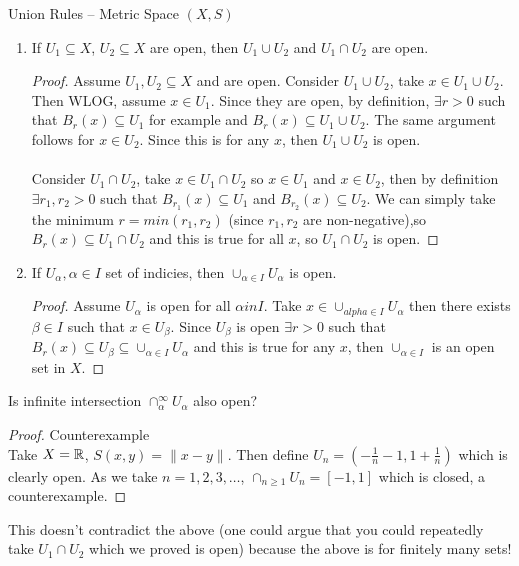 \documentclass[a4paper]{article}
\begin{document}
\begin{prop}
  Union Rules -- Metric Space $(X, S)$
  \begin{enumerate}
    \item If $U_1 \subseteq X$, $U_2 \subseteq X$ are open, then $U_1 \cup U_2$ and $U_1 \cap U_2$ are open.
      \begin{proof}
        Assume $U_1, U_2 \subseteq X$ and are open. Consider $U_1 \cup U_2$, take $x \in U_1 \cup U_2$. Then WLOG, assume $x \in
        U_1$. Since they are open, by definition, $\exists r > 0$ such that $B_r (x) \subseteq U_1$ for example and 
        $B_r (x) \subseteq U_1 \cup U_2$. The same argument follows for $x \in U_2$. Since this is for any $x$, then $U_1 \cup U_2$ is open. \\ \\
        Consider $U_1 \cap U_2$, take $x \in U_1 \cap U_2$ so $x \in U_1$ and $x \in U_2$, then by definition $\exists r_1,r_2 > 0$ such that $B_{r_1}(x) \subseteq U_1$
        and $B_{r_2}(x) \subseteq U_2$. We can simply take the minimum $r = min(r_1,r_2)$ (since $r_1,r_2$ are non-negative),so 
        $B_r(x) \subseteq U_1 \cap U_2$ and this is true for all $x$, so $U_1 \cap U_2$ is open. 
      \end{proof}
    \item If $U_{\alpha}, \alpha \in I$ set of indicies, then $\cup_{\alpha \in I} U_{\alpha}$ is open.
      \begin{proof}
        Assume $U_\alpha$ is open for all $\alpha in I$. Take $x \in \cup_{alpha \in I} U_\alpha$ then there exists $\beta \in I$ such that 
        $x \in U_{\beta}$. Since $U_\beta$ is open $\exists r > 0$ such that $B_r(x) \subseteq U_\beta \subseteq 
        \cup_{\alpha \in I} U_\alpha$ and this is true for any $x$, then $\cup_{\alpha \in I}$ is an open set in $X$.
      \end{proof}
  \end{enumerate}
\end{prop}

\begin{remark}
  Is infinite intersection $\cap_{\alpha}^\infty U_{\alpha}$ also open?
  \begin{proof}{Counterexample}\\
    Take $X = \mathbb{R}$, $S(x,y) = \| x -y\|$. Then define $U_n =\left( - \frac{1}{n} -1 , 1 + \frac{1}{n} \right)$ which
    is clearly open. As we take $n = 1,2,3,\ldots$, $\cap_{n \geq 1} U_n = [-1,1]$ which is closed, a counterexample.
  \end{proof}
  This doesn't contradict the above (one could argue that you could repeatedly take $U_1 \cap U_2$ which we proved is open)
  because the above is for finitely many sets!
\end{remark}
\end{document}
